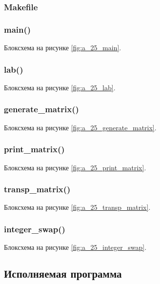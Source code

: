 \documentclass[12pt, a4paper]{article}
\begin{document}
\subsubsection{Makefile}


\subsubsection{main()}
Блоксхема на рисунке \ref{fig:a_25_main}.



\subsubsection{lab()}
Блоксхема на рисунке \ref{fig:a_25_lab}.



\subsubsection{generate\_matrix()}
Блоксхема на рисунке \ref{fig:a_25_generate_matrix}.



\subsubsection{print\_matrix()}
Блоксхема на рисунке \ref{fig:a_25_print_matrix}.



\subsubsection{transp\_matrix()}
Блоксхема на рисунке \ref{fig:a_25_transp_matrix}.



\subsubsection{integer\_swap()}
Блоксхема на рисунке \ref{fig:a_25_integer_swap}.



\subsection{Исполняемая программа}
\end{document}

